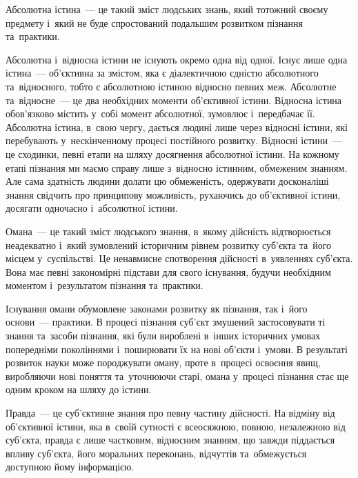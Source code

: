 \documentclass[a5paper,oneside,DIV=12,12pt,headings=small]{scrartcl}
\begin{document}
		Абсолютна істина~— це такий зміст людських знань, який тотожний своєму предмету і~який не буде спростований подальшим розвитком пізнання та~практики.

		Абсолютна і~відносна істини не існують окремо одна від одної. Існує лише одна істина~— об'\-єк\-тив\-на за змістом, яка є діалектичною єдністю абсолютного та~відносного, тобто є абсолютною істиною відносно певних меж. Абсолютне та~відносне~— це два необхідних моменти об'\-єк\-тив\-ної істини. Відносна істина обов'язково містить у~собі момент абсолютної, зумовлює і~передбачає її. Абсолютна істина, в~свою чергу, дається людині лише через відносні істини, які перебувають у~нескінченному процесі постійного розвитку. Відносні істини~— це сходинки, певні етапи на шляху досягнення абсолютної істини. На кожному етапі пізнання ми маємо справу лише з~відносно істинним, обмеженим знанням. Але сама здатність людини долати цю обмеженість, одержувати досконаліші знання свідчить про принципову можливість, рухаючись до об'\-єк\-тив\-ної істини, досягати одночасно і~абсолютної істини.

		Омана~— це такий зміст людського знання, в~якому дійсність відтворюється неадекватно і~який зумовлений історичним рівнем розвитку суб'\-єкта та~його місцем у~суспільстві. Це ненавмисне спотворення дійсності в~уявленнях суб'\-єкта. Вона має певні закономірні підстави для свого існування, будучи необхідним моментом і~результатом пізнання та~практики.

		Існування омани обумовлене законами розвитку як пізнання, так і~його основи~— практики. В процесі пізнання суб'\-єкт змушений застосовувати ті знання та~засоби пізнання, які були вироблені в~інших історичних умовах попередніми поколіннями і~поширювати їх на нові об'\-єк\-ти і~умови. В результаті розвиток науки може породжувати оману, проте в~процесі освоєння явищ, виробляючи нові поняття та~уточнюючи старі, омана у~процесі пізнання стає ще одним кроком на шляху до істини.

		Правда~— це суб'\-єк\-тив\-не знання про певну частину дійсності. На відміну від об'\-єк\-тив\-ної істини, яка в~своїй сутності є всеосяжною, повною, незалежною від суб'\-єкта, правда є лише частковим, відносним знанням, що завжди піддається впливу суб'\-єкта, його моральних переконань, відчуттів та~обмежується доступною йому інформацією.

\end{document}
